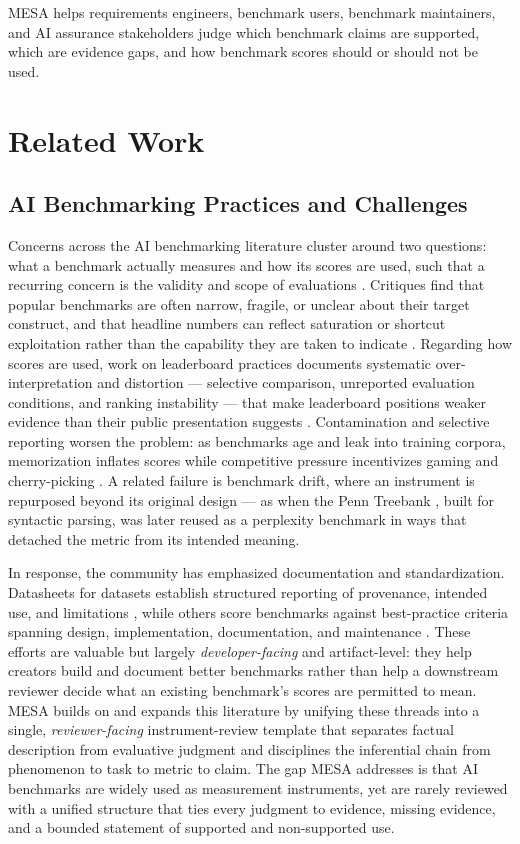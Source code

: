 \documentclass[conference]{IEEEtran}
\begin{document}
    MESA helps requirements engineers, benchmark users, benchmark maintainers, and AI assurance stakeholders judge which benchmark claims are supported, which are evidence gaps, and how benchmark scores should or should not be used.

\section{Related Work}

    \subsection{AI Benchmarking Practices and Challenges}
    
        Concerns across the AI benchmarking literature cluster around two questions: what a benchmark actually measures and how its scores are used, such that a recurring concern is the validity and scope of evaluations \cite{alonso_church_sigir}. Critiques find that popular benchmarks are often narrow, fragile, or unclear about their target construct, and that headline numbers can reflect saturation or shortcut exploitation rather than the capability they are taken to indicate \cite{jo_wilson_what_does_your_benchmark_measure,line_goes_up}. Regarding how scores are used, work on leaderboard practices documents systematic over-interpretation and distortion --- selective comparison, unreported evaluation conditions, and ranking instability --- that make leaderboard positions weaker evidence than their public presentation suggests \cite{singh_leaderboard_illusion}. Contamination and selective reporting worsen the problem: as benchmarks age and leak into training corpora, memorization inflates scores while competitive pressure incentivizes gaming and cherry-picking \cite{cheng_benchmarking_broken}. A related failure is benchmark drift, where an instrument is repurposed beyond its original design --- as when the Penn Treebank \cite{marcus_etal_1993_building}, built for syntactic parsing, was later reused as a perplexity benchmark in ways that detached the metric from its intended meaning.
        
        In response, the community has emphasized documentation and standardization. Datasheets for datasets establish structured reporting of provenance, intended use, and limitations \cite{gebru_datasheets}, while others score benchmarks against best-practice criteria spanning design, implementation, documentation, and maintenance \cite{reuel_betterbench}. These efforts are valuable but largely \emph{developer-facing} and artifact-level: they help creators build and document better benchmarks rather than help a downstream reviewer decide what an existing benchmark's scores are permitted to mean. MESA builds on and expands this literature by unifying these threads into a single, \emph{reviewer-facing} instrument-review template that separates factual description from evaluative judgment and disciplines the inferential chain from phenomenon to task to metric to claim. The gap MESA addresses is that AI benchmarks are widely used as measurement instruments, yet are rarely reviewed with a unified structure that ties every judgment to evidence, missing evidence, and a bounded statement of supported and non-supported use.
    
\end{document}
